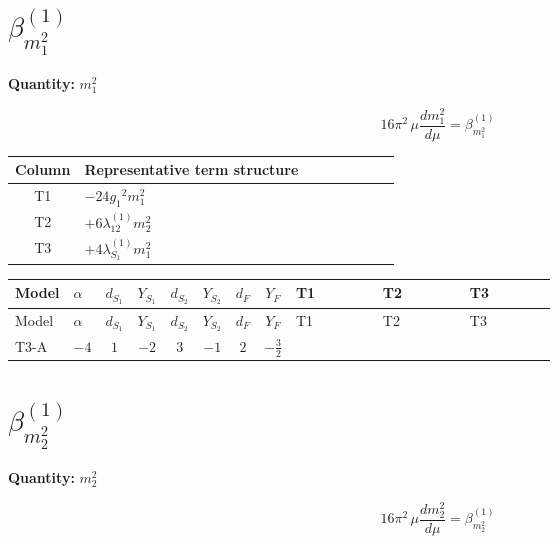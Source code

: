 \documentclass[8pt]{article}
\begin{document}
\begin{landscape}
\section*{$\beta_{m_1^2}^{(1)}$}
\noindent\textbf{Quantity: }$m_1^2$\par\smallskip
\[16\pi^2\,\mu\frac{d m_1^2}{d\mu}=\beta_{m_1^2}^{(1)}\]
\begin{center}
\begin{tabular}{@{}c >{\raggedright\arraybackslash}p{0.82\linewidth}@{}}
\toprule
Column & Representative term structure \\
\midrule
T1 & \(\displaystyle -24 {g_1}^2 {m_1^2}\) \\
\midrule
T2 & \(\displaystyle +6 {\lambda_{12}^{(1)}} {m_2^2}\) \\
\midrule
T3 & \(\displaystyle +4 {\lambda_{S_1}^{(1)}} {m_1^2}\) \\
\midrule
\bottomrule
\end{tabular}
\end{center}
\smallskip
\tiny
\begin{longtable}{@{}llcccccc >{\raggedright\arraybackslash}p{0.21\linewidth} >{\raggedright\arraybackslash}p{0.21\linewidth} >{\raggedright\arraybackslash}p{0.21\linewidth}@{}}
\toprule
Model & $\alpha$ & $d_{S_1}$ & $Y_{S_1}$ & $d_{S_2}$ & $Y_{S_2}$ & $d_F$ & $Y_F$ & T1 & T2 & T3 \\
\midrule
\endfirsthead
\toprule
Model & $\alpha$ & $d_{S_1}$ & $Y_{S_1}$ & $d_{S_2}$ & $Y_{S_2}$ & $d_F$ & $Y_F$ & T1 & T2 & T3 \\
\midrule
\endhead
T3-A & $-4$ & $1$ & $-2$ & $3$ & $-1$ & $2$ & $-\frac{3}{2}$ & \scriptsize\adjustbox{max width=\linewidth}{$\begin{gathered} -24 {g_1}^2 {m_1^2}\end{gathered}$} & \scriptsize\adjustbox{max width=\linewidth}{$\begin{gathered} +6 {\lambda_{12}^{(1)}} {m_2^2}\end{gathered}$} & \scriptsize\adjustbox{max width=\linewidth}{$\begin{gathered} +4 {\lambda_{S_1}^{(1)}} {m_1^2}\end{gathered}$} \\
\midrule
\bottomrule
\end{longtable}
\clearpage
\section*{$\beta_{m_2^2}^{(1)}$}
\noindent\textbf{Quantity: }$m_2^2$\par\smallskip
\[16\pi^2\,\mu\frac{d m_2^2}{d\mu}=\beta_{m_2^2}^{(1)}\]

\end{landscape}
\end{document}
